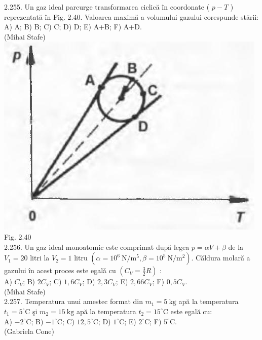 \documentclass[10pt]{article}
\begin{document}
2.255. Un gaz ideal parcurge transformarea ciclică în coordonate ( $p-T$ ) reprezentată în Fig. 2.40. Valoarea maximă a volumului gazului corespunde stării:\\ A) A; B) B; C) C; D) D; E) A+B; F) A+D.\\ (Mihai Stafe)\\ \includegraphics[max width=\textwidth, center]{2025_07_01_5b3ff9fa0d508c8e9f17g-131} Fig. 2.40\\

2.256. Un gaz ideal monoatomic este comprimat după legea $p=\alpha V+\beta$ de la $V_{1}=20$ litri la $V_{2}=1$ litru $\left(\alpha=10^{6} \mathrm{~N} / \mathrm{m}^{5}, \beta=10^{5} \mathrm{~N} / \mathrm{m}^{2}\right)$. Căldura molară a gazului în acest proces este egalǎ cu $\left(C_{V}=\frac{3}{2} R\right)$ :\\ A) $C_{V}$; B) $2 C_{V}$; C) $1,6 C_{V}$; D) $2,3 C_{V}$; E) $2,66 C_{V}$; F) $0,5 C_{V}$.\\ (Mihai Stafe)\\

2.257. Temperatura unui amestec format din $m_{1}=5 \mathrm{~kg}$ apă la temperatura $t_{1}=5^{\circ} \mathrm{C}$ şi $m_{2}=15 \mathrm{~kg}$ apă la temperatura $t_{2}=15^{\circ} \mathrm{C}$ este egală cu:\\ A) $-2^{\circ} \mathrm{C}$; B) $-1^{\circ} \mathrm{C}$; C) $12,5^{\circ} \mathrm{C}$; D) $1^{\circ} \mathrm{C}$; E) $2^{\circ} \mathrm{C}$; F) $5^{\circ} \mathrm{C}$.\\ (Gabriela Cone)\\
\end{document}
